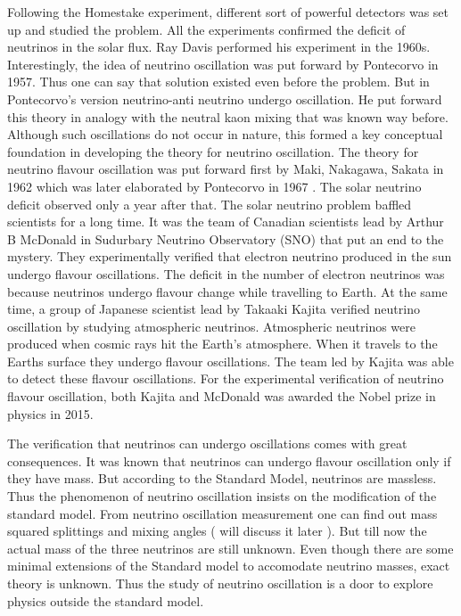 Following the Homestake experiment, different sort of powerful detectors was set up and studied the problem. All the experiments confirmed the deficit of neutrinos in the solar flux. Ray Davis performed his experiment in the 1960s. Interestingly, the idea of neutrino oscillation was put forward by Pontecorvo in 1957\cite{ponte57}. Thus one can say that solution existed even before the problem. But in Pontecorvo’s version neutrino-anti neutrino undergo oscillation. He put forward this theory in analogy with the neutral kaon mixing that was known way before. Although such oscillations do not occur in nature, this formed a key conceptual foundation in developing the theory for neutrino oscillation. The theory for neutrino flavour oscillation was put forward first by Maki, Nakagawa, Sakata in 1962 which was later elaborated by Pontecorvo in 1967 \cite{ponte68}. The solar neutrino deficit observed only a year after that. The solar neutrino problem baffled scientists for a long time. It was the team of Canadian scientists lead by Arthur B McDonald in Sudurbary Neutrino Observatory (SNO) that put an end to the mystery. They experimentally verified that electron neutrino produced in the sun undergo flavour oscillations. The deficit in the number of electron neutrinos was because neutrinos undergo flavour change while travelling to Earth\cite{mcdonald}. At the same time, a group of Japanese scientist lead by Takaaki Kajita verified neutrino oscillation by studying atmospheric neutrinos. Atmospheric neutrinos were produced when cosmic rays hit the Earth’s atmosphere. When it travels to the Earths surface they undergo flavour oscillations. The team led by Kajita was able to detect these flavour oscillations. For the experimental verification of neutrino flavour oscillation, both Kajita and McDonald was awarded the Nobel prize in physics in 2015.

The verification that neutrinos can undergo oscillations comes with great consequences. It was known that neutrinos can undergo flavour oscillation only if they have mass. But according to the Standard Model, neutrinos are massless. Thus the phenomenon of neutrino oscillation insists on the modification of the standard model. From neutrino oscillation measurement one can find out mass squared splittings and mixing angles ( will discuss it later ). But till now the actual mass of the three neutrinos are still unknown. Even though there are some minimal extensions of the Standard model to accomodate neutrino masses, exact theory is unknown. Thus the study of neutrino oscillation is a door to explore physics outside the standard model.


